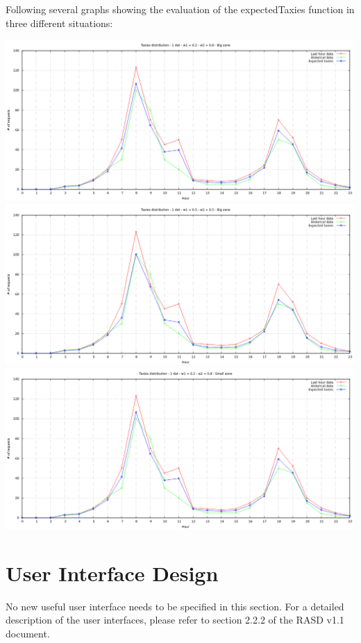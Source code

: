 \documentclass[11pt,titlepage]{article} %
\newenvironment{changemargin}[3]{%
\begin{list}{}{%
\setlength{\topsep}{0pt}%
\setlength{\headsep}{#3}%
\setlength{\leftmargin}{#1}%
\setlength{\rightmargin}{#2}%
\setlength{\listparindent}{\parindent}%
\setlength{\itemindent}{\parindent}%
\setlength{\parsep}{\parskip}%
}%
\item[]}{\end{list}}
\begin{document}
Following several graphs showing the evaluation of the expectedTaxies function in three different situations:\newline
\begin{changemargin}{-2cm}{0cm}{0cm}
	\includegraphics[scale=0.5]{graph1.png}
	\includegraphics[scale=0.5]{graph2.png}
	\includegraphics[scale=0.5]{graph3.png}
\end{changemargin}
\newpage
\section{User Interface Design}
	No new useful user interface needs to be specified in this section.\newline
	For a detailed description of the user interfaces, please refer to section 2.2.2 of the RASD v1.1 document.
\end{document}
